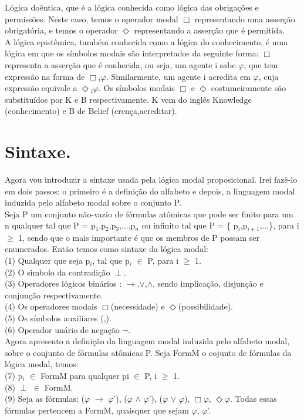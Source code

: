 \documentclass[12pt]{report}
\begin{document}
       \indent Lógica doêntica, que é a lógica conhecida como lógica das obrigações e permissões. Neste caso, temos o operador modal $\Box$ representando uma asserção obrigatória, e temos o operador $\Diamond$ representando a asserção que é permitida.\\
          \indent A lógica epistêmica, também conhecida como a lógica do conhecimento, é uma lógica em que os símbolos modais são interpretados da seguinte forma: $\Box$ representa a asserção que é conhecida, ou seja, um agente i sabe $\varphi$, que tem expressão na forma de $\Box$$_{i}$$\varphi$. Similarmente, um agente i acredita  em $\varphi$, cuja expressão equivale a $\Diamond$$_{i}$$\varphi$. Os símbolos modais  $\Box$ e $\Diamond$ costumeiramente são substituídos por K e B respectivamente. K vem do inglês Knowledge (conhecimento) e B de Belief (crença,acreditar).\\
\section{Sintaxe.}
    \hspace{0.5cm} Agora vou introduzir a sintaxe usada pela lógica modal proposicional. Irei fazê-lo em dois passos: o primeiro é a definição do alfabeto e depois, a linguagem modal induzida pelo alfabeto modal sobre o conjunto P.\\
              \indent Seja P um conjunto não-vazio de fórmulas atômicas que pode ser  finito para um n qualquer tal que P = {p$_{1}$,p$_{2}$,p$_{3}$,...,p$_{n}$} ou infinito tal que P = \{ p$_{i}$,p$_{i+1}$,...\}, para i $\geq$ 1, sendo que o mais importante é que os membros de P possam ser enumerados. Então temos como sintaxe da lógica modal:\\
\indent (1) Qualquer que seja p$_{i}$, tal que p$_{i}$ $\in$ P, para  i $\geq$ 1.\\
\indent (2) O simbolo da contradição $\perp$.\\
\indent (3) Operadores lógicos binários : $\rightarrow$,$\vee$,$\land$, sendo implicação, disjunção e conjunção respectivamente.\\
\indent (4) Os operadores modais $\Box$(necessidade) e $\Diamond$(possibilidade).\\
\indent (5) Os símbolos auxiliares (,).\\
\indent (6) Operador unário de negação $\neg$.\\
             \indent Agora apresento a definição da linguagem modal induzida pelo alfabeto modal, sobre o conjunto de fórmulas atômicas P. Seja FormM o cojunto de fórmulas da lógica modal, temos: \\
\indent (7) p$_{i}$ $\in$ FormM para qualquer pi $\in$ P,  i $\geq$ 1.\\
\indent (8) $\perp$ $\in$ FormM.\\
\indent (9) Seja as fórmulas: ($\varphi$ $\rightarrow$ $\varphi$'), ($\varphi$ $\land$ $\varphi$'), ($\varphi$ $\vee$ $\varphi$), $\Box$$\varphi$, $\Diamond$$\varphi$. Todas essas fórmulas pertencem a FormM, quaisquer que sejam $\varphi$, $\varphi$'.\\ 
\end{document}
